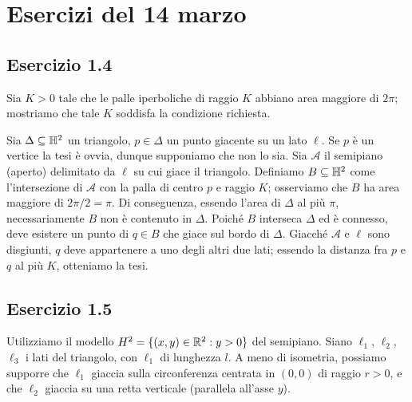 \section*{Esercizi del 14 marzo}

\subsection*{Esercizio 1.4}
Sia $K>0$ tale che le palle iperboliche di raggio $K$ abbiano area maggiore di $2\pi$; mostriamo che tale $K$ soddisfa la condizione richiesta.

Sia $\Delta\subseteq\mathbb{H}^2$ un triangolo, $p\in\Delta$ un punto giacente su un lato $\ell$. Se $p$ è un vertice la tesi è ovvia, dunque supponiamo che non lo sia. Sia $\mathcal{A}$ il semipiano (aperto) delimitato da $\ell$ su cui giace il triangolo. Definiamo $B\subseteq\mathbb{H}^2$ come l'intersezione di $\mathcal{A}$ con la palla di centro $p$ e raggio $K$; osserviamo che $B$ ha area maggiore di $2\pi/2=\pi$. Di conseguenza, essendo l'area di $\Delta$ al più $\pi$, necessariamente $B$ non è contenuto in $\Delta$. Poiché $B$ interseca $\Delta$ ed è connesso, deve esistere un punto di $q\in B$ che giace sul bordo di $\Delta$. Giacché $\mathcal{A}$ e $\ell$ sono disgiunti, $q$ deve appartenere a uno degli altri due lati; essendo la distanza fra $p$ e $q$ al più $K$, otteniamo la tesi.

\subsection*{Esercizio 1.5}
Utilizziamo il modello $H^2=\{(x,y)\in\mathbb{R}^2:y>0\}$ del semipiano.
Siano $\ell_1$, $\ell_2$, $\ell_3$ i lati del triangolo, con $\ell_1$ di lunghezza $l$. A meno di isometria, possiamo supporre che $\ell_1$ giaccia sulla circonferenza centrata in $(0,0)$ di raggio $r>0$, e che $\ell_2$ giaccia su una retta verticale (parallela all'asse $y$).

